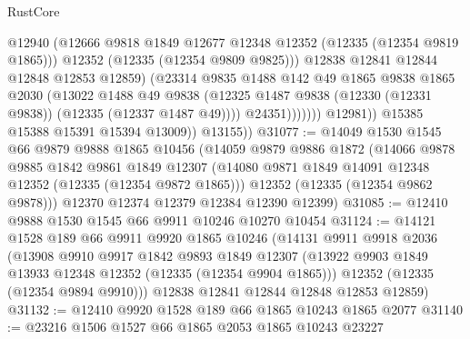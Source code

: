 \begin{lexlean}{RustCore}
\begin{coremodule}
                                @12940
                                (@12666
                                  @9818
                                  @1849
                                  @12677
                                  @12348
                                  @12352
                                  (@12335 (@12354 @9819 @1865)))
                                @12352
                                (@12335 (@12354 @9809 @9825)))
                              @12838
                              @12841
                              @12844
                              @12848
                              @12853
                              @12859)
                            (@23314
                              @9835
                              @1488
                              @142
                              @49
                              @1865
                              @9838
                              @1865
                              @2030
                              (@13022
                                @1488
                                @49
                                @9838
                                (@12325
                                  @1487
                                  @9838
                                  (@12330 (@12331 @9838))
                                  (@12335 (@12337 @1487 @49))))
                              @24351)))))))
                @12981))
            @15385
            @15388
            @15391
            @15394
            @13009))
        @13155))
@31077 := @14049
    @1530
    @1545
    @66
    @9879
    @9888
    @1865
    @10456
    (@14059
      @9879
      @9886
      @1872
      (@14066
        @9878
        @9885
        @1842
        @9861
        @1849
        @12307
        (@14080 @9871 @1849 @14091 @12348 @12352 (@12335 (@12354 @9872 @1865)))
        @12352
        (@12335 (@12354 @9862 @9878)))
      @12370
      @12374
      @12379
      @12384
      @12390
      @12399)
@31085 := @12410 @9888 @1530 @1545 @66 @9911 @10246 @10270 @10454
@31124 := @14121
    @1528
    @189
    @66
    @9911
    @9920
    @1865
    @10246
    (@14131
      @9911
      @9918
      @2036
      (@13908
        @9910
        @9917
        @1842
        @9893
        @1849
        @12307
        (@13922 @9903 @1849 @13933 @12348 @12352 (@12335 (@12354 @9904 @1865)))
        @12352
        (@12335 (@12354 @9894 @9910)))
      @12838
      @12841
      @12844
      @12848
      @12853
      @12859)
@31132 := @12410 @9920 @1528 @189 @66 @1865 @10243 @1865 @2077
@31140 := @23216 @1506 @1527 @66 @1865 @2053 @1865 @10243 @23227

\end{coremodule}
\end{lexlean}
